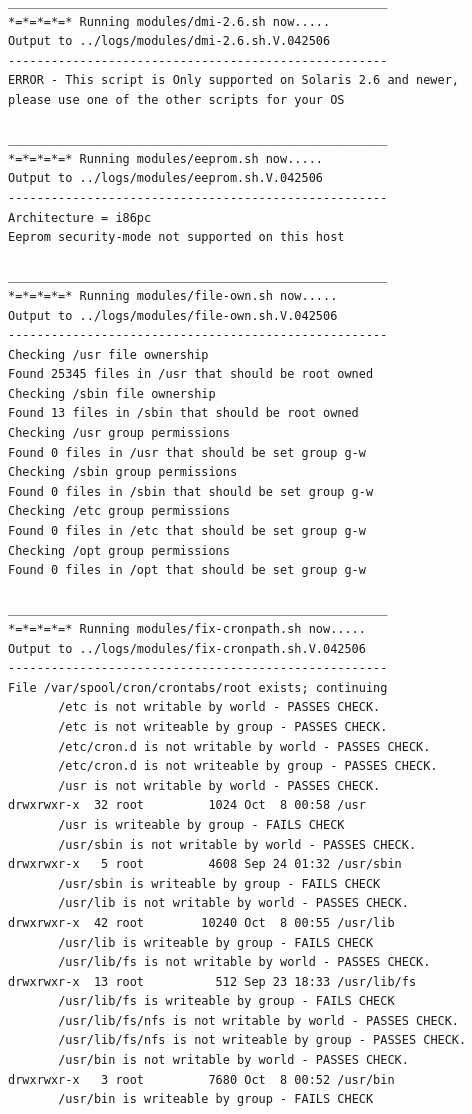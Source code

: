 \begin{verbatim}
_____________________________________________________
*=*=*=*=* Running modules/dmi-2.6.sh now.....
Output to ../logs/modules/dmi-2.6.sh.V.042506
-----------------------------------------------------
ERROR - This script is Only supported on Solaris 2.6 and newer, 
please use one of the other scripts for your OS

_____________________________________________________
*=*=*=*=* Running modules/eeprom.sh now.....
Output to ../logs/modules/eeprom.sh.V.042506
-----------------------------------------------------
Architecture = i86pc
Eeprom security-mode not supported on this host

_____________________________________________________
*=*=*=*=* Running modules/file-own.sh now.....
Output to ../logs/modules/file-own.sh.V.042506
-----------------------------------------------------
Checking /usr file ownership
Found 25345 files in /usr that should be root owned
Checking /sbin file ownership
Found 13 files in /sbin that should be root owned
Checking /usr group permissions
Found 0 files in /usr that should be set group g-w
Checking /sbin group permissions
Found 0 files in /sbin that should be set group g-w
Checking /etc group permissions
Found 0 files in /etc that should be set group g-w
Checking /opt group permissions
Found 0 files in /opt that should be set group g-w

_____________________________________________________
*=*=*=*=* Running modules/fix-cronpath.sh now.....
Output to ../logs/modules/fix-cronpath.sh.V.042506
-----------------------------------------------------
File /var/spool/cron/crontabs/root exists; continuing
       /etc is not writable by world - PASSES CHECK.
       /etc is not writeable by group - PASSES CHECK.
       /etc/cron.d is not writable by world - PASSES CHECK.
       /etc/cron.d is not writeable by group - PASSES CHECK.
       /usr is not writable by world - PASSES CHECK.
drwxrwxr-x  32 root         1024 Oct  8 00:58 /usr
       /usr is writeable by group - FAILS CHECK
       /usr/sbin is not writable by world - PASSES CHECK.
drwxrwxr-x   5 root         4608 Sep 24 01:32 /usr/sbin
       /usr/sbin is writeable by group - FAILS CHECK
       /usr/lib is not writable by world - PASSES CHECK.
drwxrwxr-x  42 root        10240 Oct  8 00:55 /usr/lib
       /usr/lib is writeable by group - FAILS CHECK
       /usr/lib/fs is not writable by world - PASSES CHECK.
drwxrwxr-x  13 root          512 Sep 23 18:33 /usr/lib/fs
       /usr/lib/fs is writeable by group - FAILS CHECK
       /usr/lib/fs/nfs is not writable by world - PASSES CHECK.
       /usr/lib/fs/nfs is not writeable by group - PASSES CHECK.
       /usr/bin is not writable by world - PASSES CHECK.
drwxrwxr-x   3 root         7680 Oct  8 00:52 /usr/bin
       /usr/bin is writeable by group - FAILS CHECK
    

\end{verbatim}
